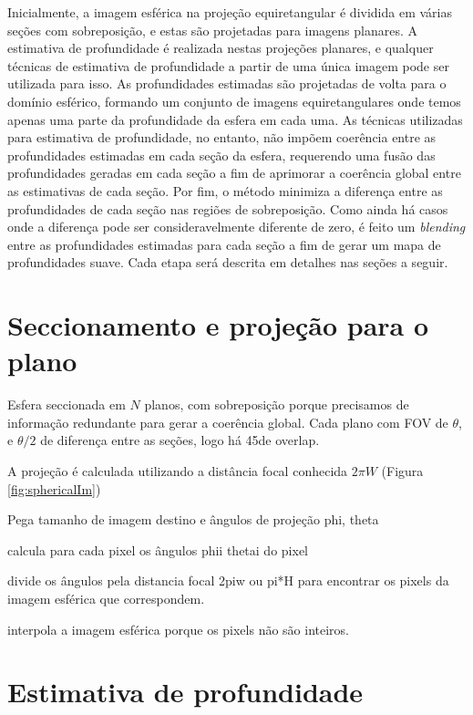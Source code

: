 \documentclass[cic,tc]{iiufrgs}
\begin{document}
Inicialmente, a imagem esférica na projeção equiretangular é dividida em várias seções com sobreposição, e estas são projetadas para imagens planares. A estimativa de profundidade é realizada nestas projeções planares, e qualquer técnicas de estimativa de profundidade a partir de uma única imagem pode ser utilizada para isso.  As profundidades estimadas são projetadas de volta para o domínio esférico, formando um conjunto de imagens equiretangulares onde temos apenas uma parte da profundidade da esfera em cada uma. As técnicas utilizadas para estimativa de profundidade, no entanto, não impõem coerência entre as profundidades estimadas em cada seção da esfera, requerendo uma fusão das profundidades geradas em cada seção a fim de aprimorar a coerência global entre as estimativas de cada seção. Por fim, o método minimiza a diferença entre as profundidades de cada seção nas regiões de sobreposição. Como ainda há casos onde a diferença pode ser consideravelmente diferente de zero, é feito um \textit{blending} entre as profundidades estimadas para cada seção a fim de gerar um mapa de profundidades suave. Cada etapa será descrita em detalhes nas seções a seguir.

\section{Seccionamento e projeção para o plano}

Esfera seccionada em $N$ planos, com sobreposição porque precisamos de informação redundante para gerar a coerência global. Cada plano com FOV de $\theta$, e $\theta/2$ de diferença entre as seções, logo há 45\degree de overlap.

A projeção é calculada utilizando a distância focal conhecida $2\pi W$ (Figura \ref{fig:sphericalIm})

Pega tamanho de imagem destino e ângulos de projeção phi, theta

calcula para cada pixel os ângulos phii thetai do pixel

divide os ângulos pela distancia focal 2piw ou pi*H para encontrar os pixels da imagem esférica que correspondem.

interpola a imagem esférica porque os pixels não são inteiros.



\section{Estimativa de profundidade}
\end{document}
